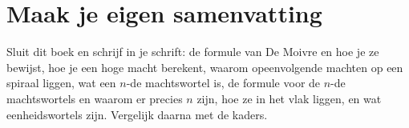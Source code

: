 
\ifzelfstudie
\section*{Maak je eigen samenvatting}
Sluit dit boek en schrijf in je schrift: de formule van De Moivre en hoe je ze bewijst, hoe je een hoge macht berekent, waarom opeenvolgende machten op een spiraal liggen, wat een $n$-de machtswortel is, de formule voor de $n$-de machtswortels en waarom er precies $n$ zijn, hoe ze in het vlak liggen, en wat eenheidswortels zijn. Vergelijk daarna met de kaders.
\fi
